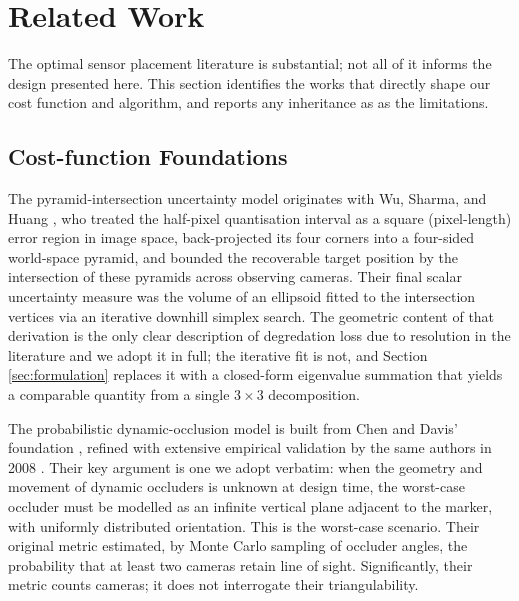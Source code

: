 \documentclass[conference]{IEEEtran}
\begin{document}
\section{Related Work}
\label{sec:related}
The optimal sensor placement literature is substantial; not all of it informs the design presented here. This section identifies the works that directly shape our cost function and algorithm, and reports any inheritance as as the limitations.

\subsection{Cost-function Foundations}

The pyramid-intersection uncertainty model originates with Wu, Sharma, and Huang \cite{sharma_analysis_1998}, who treated the half-pixel quantisation interval as a square (pixel-length) error region in image space, back-projected its four corners into a four-sided world-space pyramid, and bounded the recoverable target position by the intersection of these pyramids across observing cameras. Their final scalar uncertainty measure was the volume of an ellipsoid fitted to the intersection vertices via an iterative downhill simplex search. The geometric content of that derivation is the only clear description of degredation loss due to resolution in the literature and we adopt it in full; the iterative fit is not, and Section \ref{sec:formulation} replaces it with a closed-form eigenvalue summation that yields a comparable quantity from a single $3\!\times\!3$ decomposition.

The probabilistic dynamic-occlusion model is built from Chen and Davis' foundation \cite{chen_camera_2000}, refined with extensive empirical validation by the same authors in 2008 \cite{chen_occlusion_2008}. Their key argument is one we adopt verbatim: when the geometry and movement of dynamic occluders is unknown at design time, the worst-case occluder must be modelled as an infinite vertical plane adjacent to the marker, with uniformly distributed orientation. This is the worst-case scenario. Their original metric estimated, by Monte Carlo sampling of occluder angles, the probability that at least two cameras retain line of sight. Significantly, their metric counts cameras; it does not interrogate their triangulability.
\end{document}
